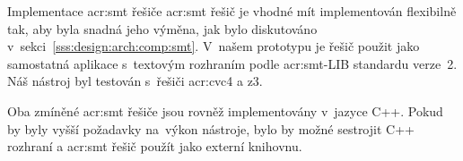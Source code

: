 \documentclass[thesis=M,czech]{FITthesis}[2012/06/26]
\newcommand{\acrlabel}[1]{acr:#1}
\newcommand{\acr}[1]{\acrshort{\acrlabel{#1}}}
\newcommand{\rf}[1]{\ref{#1}}
\begin{document}

\begin{section}{Implementace \acr{smt} řešiče}\label{s:impl:smt}
\acr{smt} řešič je vhodné mít implementován flexibilně tak,
aby byla snadná jeho výměna, jak bylo diskutováno
v~sekci~\rf{sss:design:arch:comp:smt}.
V~našem prototypu je řešič použit jako samostatná aplikace
s~textovým rozhraním podle \acr{smt}-LIB standardu verze~2.
Náš nástroj byl testován s~řešiči \acr{cvc}4 a z3.

Oba zmíněné \acr{smt} řešiče jsou rovněž implementovány v~jazyce C++.
Pokud by byly vyšší požadavky na~výkon nástroje,
bylo by možné sestrojit C++ rozhraní a \acr{smt} řešič použít
jako externí knihovnu.
\end{section} %

\end{document}
